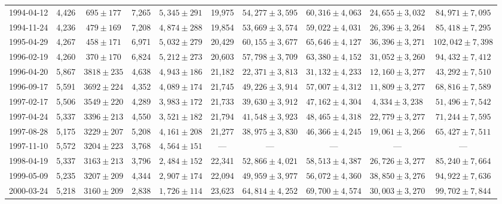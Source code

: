 \begin{landscape}
\begin{longtable}{cccccccccc}
{1994-04-12} & 4,426 & {$695  \pm  177$} & 7,265 & {$5,345 \pm 291$} & 19,975 & {$54,277 \pm 3,595$} & {$60,316 \pm 4,063$} & {$24,655 \pm 3,032$} & {$84,971 \pm 7,095$} \\
{1994-11-24} & 4,236 & {$479  \pm  169$} & 7,208 & {$4,874 \pm 288$} & 19,854 & {$53,669 \pm 3,574$} & {$59,022 \pm 4,031$} & {$26,396 \pm 3,264$} & {$85,418 \pm 7,295$} \\
{1995-04-29} & 4,267 & {$458  \pm  171$} & 6,971 & {$5,032 \pm 279$} & 20,429 & {$60,155 \pm 3,677$} & {$65,646 \pm 4,127$} & {$36,396 \pm 3,271$} & {$102,042 \pm 7,398$} \\
{1996-02-19} & 4,260 & {$370  \pm  170$} & 6,824 & {$5,212 \pm 273$} & 20,603 & {$57,798 \pm 3,709$} & {$63,380 \pm 4,152$} & {$31,052 \pm 3,260$} & {$94,432 \pm 7,412$} \\
{1996-04-20} & 5,867 & {$3818  \pm  235$} & 4,638 & {$4,943 \pm 186$} & 21,182 & {$22,371 \pm 3,813$} & {$31,132 \pm 4,233$} & {$12,160 \pm 3,277$} & {$43,292 \pm 7,510$} \\
{1996-09-17} & 5,591 & {$3692  \pm  224$} & 4,352 & {$4,089 \pm 174$} & 21,745 & {$49,226 \pm 3,914$} & {$57,007 \pm 4,312$} & {$11,809 \pm 3,277$} & {$68,816 \pm 7,589$} \\
{1997-02-17} & 5,506 & {$3549  \pm  220$} & 4,289 & {$3,983 \pm 172$} & 21,733 & {$39,630 \pm 3,912$} & {$47,162 \pm 4,304$} & {$4,334 \pm 3,238$} & {$51,496 \pm 7,542$} \\
{1997-04-24} & 5,337 & {$3396  \pm  213$} & 4,550 & {$3,521 \pm 182$} & 21,794 & {$41,548 \pm 3,923$} & {$48,465 \pm 4,318$} & {$22,779 \pm 3,277$} & {$71,244 \pm 7,595$} \\
{1997-08-28} & 5,175 & {$3229  \pm  207$} & 5,208 & {$4,161 \pm 208$} & 21,277 & {$38,975 \pm 3,830$} & {$46,366 \pm 4,245$} & {$19,061 \pm 3,266$} & {$65,427 \pm 7,511$} \\
{1997-11-10} & 5,572 & {$3204  \pm  223$} & 3,768 & {$4,564 \pm 151$} & --- & --- & --- & --- & --- \\
{1998-04-19} & 5,337 & {$3163  \pm  213$} & 3,796 & {$2,484 \pm 152$} & 22,341 & {$52,866 \pm 4,021$} & {$58,513 \pm 4,387$} & {$26,726 \pm 3,277$} & {$85,240 \pm 7,664$} \\
{1999-05-09} & 5,235 & {$3207  \pm  209$} & 4,344 & {$2,907 \pm 174$} & 22,094 & {$49,959 \pm 3,977$} & {$56,072 \pm 4,360$} & {$38,850 \pm 3,276$} & {$94,922 \pm 7,636$} \\
{2000-03-24} & 5,218 & {$3160  \pm  209$} & 2,838 & {$1,726 \pm 114$} & 23,623 & {$64,814 \pm 4,252$} & {$69,700 \pm 4,574$} & {$30,003 \pm 3,270$} & {$99,702 \pm 7,844$} \\

\end{longtable}
\end{landscape}
